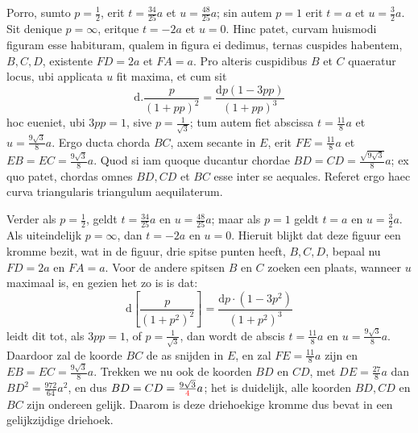 \documentclass[10pt,a4paper]{article}
\def\D{\mathrm{d}}
\begin{document}
\begin{paracol}{2}
\begin{enumerate}[topsep=1px]
		\par Porro, sumto $p=\frac{1}{2}$, erit $t=\frac{34}{25}a$ et $u=\frac{48}{25}a$; sin autem $p=1$ erit $t=a$ et $u=\frac{3}{2}a$. Sit denique $p=\infty$, eritque $t=-2a$ et $u=0$. Hinc patet, curvam huismodi figuram esse habituram, qualem in figura ei dedimus, ternas cuspides habentem, $B,C,D$, existente $FD=2a$ et $FA=a$. Pro alteris cuspidibus $B$ et $C$ quaeratur locus, ubi applicata $u$ fit maxima, et cum sit
		\[
			\D.\frac{p}{(1+pp)^2} = \frac{\D p(1-3pp)}{(1+pp)^3}
		\]
		hoc eueniet, ubi $3pp=1$, sive $p=\frac{1}{\sqrt{3}}$; tum autem fiet abscissa $t=\frac{11}{8}a$ et $u=\frac{9\sqrt{3}}{8}a$. Ergo ducta chorda $BC$, axem secante in $E$, erit $FE= \frac{11}{8}a$ et $EB=EC=\frac{9\sqrt{3}}{8}a$. Quod si iam quoque ducantur chordae $BD=CD = \frac{\sqrt{9\sqrt{3}}}{8}a$; ex quo patet, chordas omnes $BD, CD$ et $BC$ esse inter se aequales. Referet ergo haec curva triangularis triangulum aequilaterum.
		
		\switchcolumn
		
		\par Verder als $p=\frac{1}{2}$, geldt $t = \frac{34}{25}a$ en $u= \frac{48}{25}a$; maar als $p=1$ geldt $t=a$ en $u=\frac{3}{2}a$. Als uiteindelijk $p=\infty$, dan $t=-2a$ en $u=0$. Hieruit blijkt dat deze figuur een kromme bezit, wat in de figuur, drie spitse punten heeft, $B,C,D$, bepaal nu $FD=2a$ en $FA=a$. Voor de andere spitsen $B$ en $C$ zoeken een plaats, wanneer $u$ maximaal is, en gezien het zo is is dat:
		\[
			\D\left[\frac{p}{(1+p^2)^2}\right] = \frac{\D p\cdot (1-3p^2)}{(1+p^2)^3}
		\]
		leidt dit tot, als $3pp=1$, of $p=\frac{1}{\sqrt{3}}$, dan wordt de abscis $t=\frac{11}{8}a$ en $u=\frac{9\sqrt{3}}{8}a$. Daardoor zal de koorde $BC$ de as snijden in $E$, en zal $FE=\frac{11}{8}a$ zijn en $EB=EC=\frac{9\sqrt{3}}{8}a$. Trekken we nu ook de koorden $BD$ en $CD$, met $DE=\frac{27}{8}a$ dan $BD^2 = \frac{972}{64}a^2$, en dus $BD=CD = \frac{9\sqrt{3}}{\color{red}4}a$; het is duidelijk, alle koorden $BD, CD$ en $BC$ zijn ondereen gelijk. Daarom is deze driehoekige kromme dus bevat in een gelijkzijdige driehoek.

		\newpage
		\switchcolumn*
		

\end{enumerate}
\end{paracol}
\end{document}
